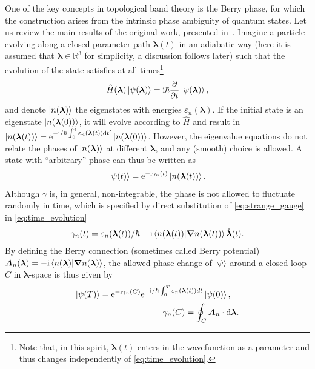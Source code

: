 One of the key concepts in topological band theory is the Berry phase, for which the construction arises from the intrinsic phase ambiguity of quantum states.
Let us review the main results of the original work, presented in~\cite{Berry1984}.
Imagine a particle evolving along a closed parameter path ${\bm \lambda}(t)$ in an adiabatic way (here it is assumed that $\bm \lambda\in\mathds R^3$ for simplicity, a discussion follows later) such that the evolution of the state satisfies at all times\footnote{Note that, in this spirit, $\bm \lambda(t)$ enters in the wavefunction as a parameter and thus changes independently of \cref{eq:time_evolution}.}
\begin{align}
    \hat H(\bm \lambda)\ket{\psi(\bm \lambda)} = \mathrm i\hbar\frac{\partial}{\partial t}\ket{\psi({\bm \lambda})},
    \label{eq:time_evolution}
\end{align}
and denote $\ket{n(\bm \lambda)}$ the eigenstates with energies $\varepsilon_n(\bm \lambda)$.
If the initial state is an eigenstate $\ket{n(\bm \lambda(0))}$, it will evolve according to $\hat H$ and result in $\ket{n(\bm \lambda(t))}=\mathrm e^{-\mathrm i/\hbar\int_0^t \varepsilon_n(\bm \lambda(t))\mathrm d t'}\ket{n(\bm \lambda(0))}$.
However, the eigenvalue equations do not relate the phases of $\ket{n(\bm \lambda)}$ at different $\bm \lambda$, and any (smooth) choice is allowed.
A state with ``arbitrary'' phase can thus be written as
\begin{align}
    \ket{\psi(t)} = \mathrm e^{-\mathrm i\gamma_n(t)}\ket{n(\bm \lambda(t))}.
    \label{eq:strange_gauge}
\end{align}
Although $\gamma$ is, in general, non-integrable, the phase is not allowed to fluctuate randomly in time, which is specified by direct substitution of \cref{eq:strange_gauge} in \cref{eq:time_evolution}
\begin{align}
    \dot\gamma_n(t) = \varepsilon_n(\bm \lambda(t))/\hbar -\mathrm i \braket{n({\bm \lambda(t)})|\bm\nabla n({\bm \lambda(t)})} \dot{\bm \lambda}(t).
    \label{eq:phase_evolution}
\end{align}
By defining the Berry connection (sometimes called Berry potential) $\bm A_n(\bm \lambda) = -\mathrm i \braket{n(\bm \lambda)|\bm\nabla n(\bm \lambda)}$, the allowed phase change of $\ket\psi$ around a closed loop $C$ in $\bm \lambda$-space is thus given by
\begin{align}
    \ket{\psi(T)} = \mathrm e^{-\mathrm i \gamma_n(C)}\mathrm e^{-\mathrm i/\hbar\int_0^T\varepsilon_n(\bm \lambda(t))dt}\ket{\psi(0)}
    ,\quad
    \\
    \gamma_n(C) = \oint_C{\bm A_n}\cdot\mathrm d \bm \lambda.
    \label{eq:phase_change}
\end{align}
